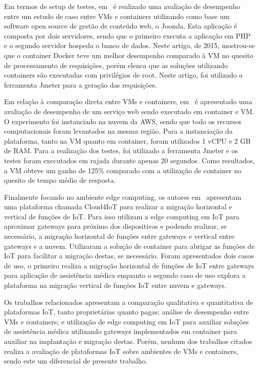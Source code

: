 \documentclass{sbrt}
\begin{document}
Em termos de setup de testes, em~\cite{joy2015} é realizado  uma avaliação de desempenho entre um estudo de caso entre VMs e containers utilizando como base um software open source de gestão de conteúdo web, o Joomla. Esta aplicação é composta por dois servidores, sendo que o primeiro executa a aplicação em PHP e o segundo servidor hospeda o banco de dados. Neste artigo, de 2015, mostrou-se que o container Docker teve um melhor desempenho comparado à VM no quesito de processamento de requisições, porém elenca que as soluções utilizando containers são executadas com privilégios de root. Neste artigo, foi utilizado a ferramenta Jmeter para a geração das requisições.

Em relação à comparação direta entre VMs e containers, em~\cite{salah2017performance} é apresentado uma avaliação de desempenho de um serviço web sendo executado em container e VM. O experimento foi instanciado na nuvem da AWS, sendo que todo os recursos computacionais foram levantados na mesma região. Para a instanciação da plataforma, tanto na VM quanto em container, foram utilizados 1 vCPU e 2 GB de RAM. Para a realização dos testes, foi utilizado a ferramenta Jmeter e os testes foram executados em rajada durante apenas 20 segundos. Como resultados, a VM obteve um ganho de 125{\%} comparado com a utilização de container no quesito de tempo médio de resposta.

Finalmente focando no ambiente edge computing, os autores em~\cite{dupont2017} apresentam uma plataforma chamada Cloud4IoT para realizar a migração horizontal e vertical de funções de IoT. Para isso utilizam a edge computing em IoT para aproximar gateways para próximo dos dispositivos e podendo realizar, se necessário, a migração horizontal de funções entre gateways e vertical entre gateways e a nuvem. Utilizaram a solução de container para abrigar as funções de IoT para facilitar a migração destas, se necessário. Foram apresentados dois casos de uso, o primeiro realiza a migração horizontal de funções de IoT entre gateways para aplicação de assistência médica enquanto o segundo caso de uso explora a plataforma na migração vertical de funções IoT entre nuvem e gateways.

Os trabalhos relacionados apresentam a comparação qualitativa e quantitativa de plataformas IoT, tanto proprietárias quanto pagas; análise de desempenho entre VMs e containers; e utilização de edge computing em IoT para auxiliar soluções de assistência médica utilizando gateways implementados em container para auxiliar na implantação e migração destas. Porém, nenhum dos trabalhos citados realiza a avaliação de plataformas IoT sobre ambientes de VMs e containers, sendo este um diferencial de presente trabalho.
\end{document}
